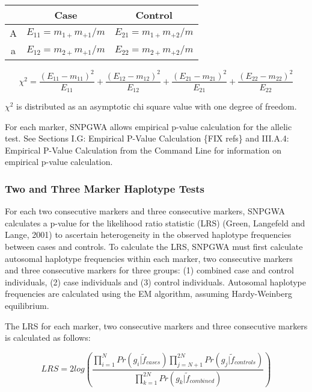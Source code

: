 \begin{center}
  \begin{tabular}{ccc}
    \hline
    {} & Case & Control \\
    \hline
    A  & $E_{11} = m_{1+}m_{+1}/m$ & $E_{21} = m_{1+}m_{+2}/m$ \\
    a  & $E_{12} = m_{2+}m_{+1}/m$ & $E_{22} = m_{2+}m_{+2}/m$ \\  
    \hline
  \end{tabular}
\end{center}


\begin{equation*}
  \chi^2 = \frac{\left(E_{11} - m_{11}\right)^2}{E_{11}} + \frac{\left(E_{12} - m_{12}\right)^2}{E_{12}} + \frac{\left(E_{21} - m_{21}\right)^2}{E_{21}} + \frac{\left(E_{22} - m_{22}\right)^2}{E_{22}}
\end{equation*}

$\chi^2$ is distributed as an asymptotic chi square value with one degree of
freedom.

For each marker, SNPGWA allows empirical p-value calculation for the allelic
test.  See Sections I.G: Empirical P-Value Calculation \{FIX refs\} and III.A.4:
Empirical P-Value Calculation from the Command Line for information on empirical
p-value calculation.


\subsubsection{Two and Three Marker Haplotype Tests}
For each two consecutive markers and three consecutive markers, SNPGWA
calculates a p-value for the likelihood ratio statistic (LRS) (Green, Langefeld
and Lange, 2001) to ascertain heterogeneity in the observed haplotype
frequencies between cases and controls.  To calculate the LRS, SNPGWA must first
calculate autosomal haplotype frequencies within each marker, two consecutive
markers and three consecutive markers for three groups: (1) combined case and
control individuals, (2) case individuals and (3) control individuals.
Autosomal haplotype frequencies are calculated using the EM algorithm, assuming
Hardy-Weinberg equilibrium.

The LRS for each marker, two consecutive markers and three consecutive markers
is calculated as follows:

\begin{equation*}
  LRS = 2log\left(\frac{\prod^N_{i=1}{Pr\left(g_i|\tilde{f}_{cases}\right)}\prod^{2N}_{j=N+1}Pr\left(g_j|\tilde{f}_{controls}\right)}{\prod^{2N}_{k=1}Pr\left(g_k|\tilde{f}_{combined}\right)}\right)
\end{equation*}

